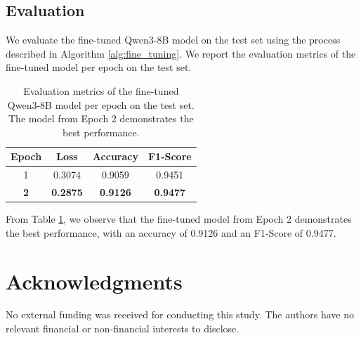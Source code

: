 \documentclass{article}
\begin{document}
\subsection{Evaluation}
\label{ssec:evaluation}

We evaluate the fine-tuned Qwen3-8B model on the test set using the process described in 
Algorithm \ref{alg:fine_tuning}.
We report the evaluation metrics of the fine-tuned model per epoch on the test set.

\begin{table}[H]
\centering
\caption{Evaluation metrics of the fine-tuned Qwen3-8B model per epoch on the test set. The model from Epoch 2 demonstrates the best performance.}
\label{tbl:eval_results}
\begin{tabular}{@{}cccc@{}}
\toprule
\textbf{Epoch} & \textbf{Loss} & \textbf{Accuracy} & \textbf{F1-Score} \\ \midrule
1 & 0.3074& 0.9059 & 0.9451 \\
\textbf{2} & \textbf{0.2875} & \textbf{0.9126} & \textbf{0.9477} \\
\end{tabular}
\end{table}

From Table \ref{tbl:eval_results}, we observe that the fine-tuned model from Epoch 2 demonstrates the best 
performance, with an accuracy of 0.9126 and an F1-Score of 0.9477.

\section{Acknowledgments}
\label{sec:acknowledgments}
No external funding was received for conducting this study. The authors have no relevant financial or non-financial interests to disclose.


% 

\end{document}

